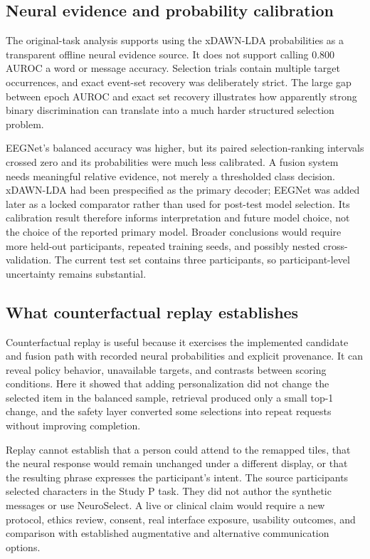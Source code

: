 \documentclass[11pt]{article}
\begin{document}
\subsection{Neural evidence and probability calibration}

The original-task analysis supports using the xDAWN-LDA probabilities as a transparent offline neural evidence source. It does not support calling 0.800 AUROC a word or message accuracy. Selection trials contain multiple target occurrences, and exact event-set recovery was deliberately strict. The large gap between epoch AUROC and exact set recovery illustrates how apparently strong binary discrimination can translate into a much harder structured selection problem.


EEGNet's balanced accuracy was higher, but its paired selection-ranking intervals crossed zero and its probabilities were much less calibrated. A fusion system needs meaningful relative evidence, not merely a thresholded class decision. xDAWN-LDA had been prespecified as the primary decoder; EEGNet was added later as a locked comparator rather than used for post-test model selection. Its calibration result therefore informs interpretation and future model choice, not the choice of the reported primary model. Broader conclusions would require more held-out participants, repeated training seeds, and possibly nested cross-validation. The current test set contains three participants, so participant-level uncertainty remains substantial.


\subsection{What counterfactual replay establishes}

Counterfactual replay is useful because it exercises the implemented candidate and fusion path with recorded neural probabilities and explicit provenance. It can reveal policy behavior, unavailable targets, and contrasts between scoring conditions. Here it showed that adding personalization did not change the selected item in the balanced sample, retrieval produced only a small top-1 change, and the safety layer converted some selections into repeat requests without improving completion.


Replay cannot establish that a person could attend to the remapped tiles, that the neural response would remain unchanged under a different display, or that the resulting phrase expresses the participant's intent. The source participants selected characters in the Study P task. They did not author the synthetic messages or use NeuroSelect. A live or clinical claim would require a new protocol, ethics review, consent, real interface exposure, usability outcomes, and comparison with established augmentative and alternative communication options.
\end{document}
